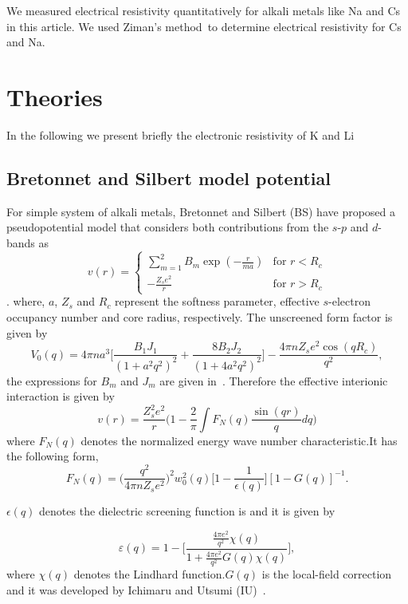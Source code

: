 \documentclass[final,12pt]{elsarticle}
\begin{document}
We measured electrical resistivity quantitatively for alkali metals like Na and Cs in this article. We used Ziman's method~\cite{ziman1961}to determine electrical resistivity for Cs and Na.

\section{Theories}
In the following we present briefly the electronic resistivity of K and Li
\label{theory}
\subsection{Bretonnet and Silbert model potential}
For simple system of alkali metals, Bretonnet and Silbert (BS) have proposed a pseudopotential model that considers both contributions from the $s$-$p$ and $d$- bands as
\begin{equation}
v(r) = \left\{ \begin{array}{ll}
\sum_{m=1}^{2}B_{m}\exp(-\frac{r}{ma}) & \mbox{for $r < R_{c}$} \\
-\frac{Z_{s}e^{2}}{r} & \mbox {for $r > R_{c}$}\end{array}\right.
\end{equation}.
where, $a$, $Z_{s}$ and $R_{c}$ represent the softness parameter, effective $s$-electron occupancy number and core radius, respectively. The unscreened form factor is given by
\begin{equation}
V_{0}(q)=4\pi na^{3}\Bigg[\frac{B_{1}J_{1}}{(1+a^{2}q^{2})^{2}}+\frac{8B_{2}J_{2}}{(1+4a^{2}q^{2})^{2}}\Bigg]-\frac{4\pi n Z_{s}e^{2}\cos(qR_{c})}{q^{2}},
\end{equation}
 the expressions for $B_{m}$ and $J_{m}$ are given
in~\cite{Bret1992}. Therefore the effective interionic interaction is given by
\begin{equation}
v(r)=\frac{Z_{s}^{2}e^2}{r}\Bigg(1-\frac{2}{\pi}\int F_{N}(q)\frac{\sin(qr)}{q}dq\Bigg)
\end{equation}
where $F_{N}(q)$ denotes the normalized energy wave number characteristic.It has the following form,
\begin{equation}
F_{N}(q)=\Bigg(\frac{q^{2}}{4\pi n Z_{s}e^{2}}\Bigg)^{2}w_{0}^{2}(q)\Bigg[1-\frac{1}{\epsilon(q)}\Bigg][1-G(q)]^{-1}.
\end{equation}


 $\epsilon(q)$ denotes the dielectric screening function is and it is given by
 
 
\begin{equation}
\label{EP0}
\varepsilon(q)=1-\Bigg[\frac{\frac{4\pi e^{2}}{q^{2}}\chi(q)}{1+\frac{4\pi e^{2}}{q^{2}}G(q)\chi(q)}\Bigg],
\end{equation} 
where $\chi(q)$ denotes the Lindhard function.$G(q)$ is the local-field correction and it was developed by Ichimaru and Utsumi (IU)~\cite{Ichimaru1981}.
\end{document}
